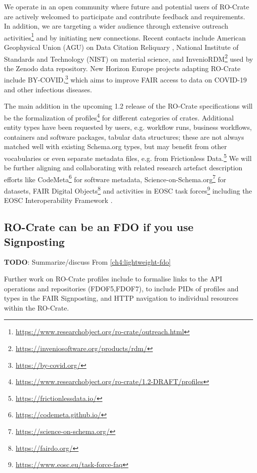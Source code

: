 We operate in an open community where future and potential users of
RO-Crate are actively welcomed to participate and contribute feedback
and requirements. In addition, we are targeting a wider audience through
extensive
outreach
activities\footnote{\url{https://www.researchobject.org/ro-crate/outreach.html}} and by initiating new connections. Recent contacts include
American Geophysical Union (AGU) on Data Citation Reliquary
\cite{Agarwal 2021}, National
Institute of Standards and Technology (NIST) on material science, and
InvenioRDM\footnote{\url{https://inveniosoftware.org/products/rdm/}} used by the
Zenodo data repository. New Horizon Europe projects adapting RO-Crate
include BY-COVID,\footnote{\url{https://by-covid.org/}} which aims to improve FAIR
access to data on COVID-19 and other infectious diseases.

The main addition in the upcoming 1.2 release of the RO-Crate
specifications will be the formalization of
profiles\footnote{\url{https://www.researchobject.org/ro-crate/1.2-DRAFT/profiles}}
for different categories of crates. Additional entity types have been
requested by users, e.g. workflow runs, business workflows, containers
and software packages, tabular data structures; these are not always
matched well with existing Schema.org types, but may benefit from other
vocabularies or even separate metadata files, e.g. from Frictionless
Data.\footnote{\url{https://frictionlessdata.io/}} We will be further aligning
and collaborating with related research artefact description efforts
like CodeMeta\footnote{\url{https://codemeta.github.io/}} for software metadata,
Science-on-Schema.org\footnote{\url{https://science-on-schema.org/}}
\cite{ch5-66} for datasets, FAIR Digital
Objects\footnote{\url{https://fairdo.org/}} \cite{De Smedt 2020} and
activities in EOSC task forces\footnote{\url{https://www.eosc.eu/task-force-faq}}
including the EOSC Interoperability Framework \cite{eosc-interop-framework}.




\subsection{RO-Crate can be an FDO if you use Signposting}

\textbf{TODO}: Summarize/discuss 
From \vref{ch4:lightweight-fdo}

Further work on RO-Crate profiles include to formalise links to the API
operations and repositories (FDOF5,FDOF7), to include PIDs of
profiles and types in the FAIR Signposting, and HTTP navigation to
individual resources within the RO-Crate.

